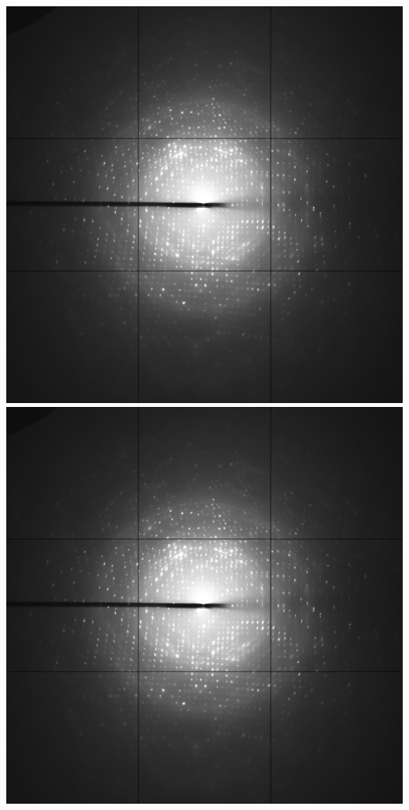 \documentclass[slides,compress]{beamer}
\begin{document}
\begin{frame}
{{\includegraphics[scale=0.05]{figures/example-diffraction-image-small.jpg} 
\includegraphics[scale=0.05]{figures/example-diffraction-image-small.jpg}
}
}
\end{frame}
\end{document}
